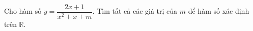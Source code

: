 \begin{ex}
Cho hàm số $y=\dfrac{2x+1}{x^2+x+m}$. Tìm tất cả các giá trị của $m$ để hàm số xác định trên $\mathbb R$.
\end{ex}
